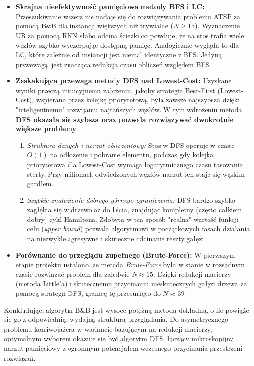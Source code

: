 \documentclass[12pt, a4paper]{article}
\begin{document}
\begin{itemize}
	\item \textbf{Skrajna nieefektywność pamięciowa metody BFS i LC:} Przeszukiwanie wszerz nie nadaje się do rozwiązywania problemu ATSP za pomocą B\&B dla instancji większych niż trywialne ($N \ge 15$). Wyznaczenie UB za pomocą RNN słabo odcina ścieżki co powduje, że na stos trafia wiele węzłów szybko wyczerpując dostępną pamięc. Analogicznie wygląda to dla LC, które zależnie od instancji jest niemal identyczne z BFS. Jedyną przwewagą jest znacząca redukcja czasu obliczeń względem BFS.
	
	\item \textbf{Zaskakująca przewaga metody DFS nad Lowest-Cost:} Uzyskane wyniki przeczą intuicyjnemu założeniu, jakoby strategia Best-First (Lowest-Cost), wspierana przez kolejkę priorytetową, była zawsze najszybsza dzięki "inteligentnemu" rozwijaniu najtańszych węzłów. W tym wdrożeniu metoda \textbf{DFS okazała się szybsza oraz pozwala rozwiązywać dwukrotnie większe problemy} 
	\begin{enumerate}
		\item \textit{Struktura danych i narzut obliczeniowy:} Stos w DFS operuje w czasie $O(1)$ na odłożenie i pobranie elementu, podczas gdy kolejka priorytetowa dla Lowest-Cost wymaga logarytmicznego czasu tasowania sterty. Przy milionach odwiedzonych węzłów narzut ten staje się wąskim gardłem.
		\item \textit{Szybkie znalezienie dobrego górnego ograniczenia:} DFS bardzo szybko zagłębia się w drzewo aż do liścia, znajdując kompletny (często całkiem dobry) cykl Hamiltona. Zdobyta w ten sposób "realna" wartość funkcji celu (\textit{upper bound}) pozwala algorytmowi w początkowych fazach działania na niezwykle agresywne i skuteczne odcinanie reszty gałęzi.
	\end{enumerate}
	
	\item \textbf{Porównanie do przeglądu zupełnego (Brute-Force):} W pierwszym etapie projektu ustalono, że metoda \textit{Brute-Force} była w stanie w rozsądnym czasie rozwiązać problem dla zaledwie $N \approx 15$. Dzięki redukcji macierzy (metoda Little'a) i skutecznemu przycinaniu nieskutecznych gałęzi drzewa za pomocą strategii DFS, granicę tę przesunięto do $N \approx 39$.
\end{itemize}

Konkludując, algorytm B\&B jest wysoce potężną metodą dokładną, o ile powiąże się go z odpowiednią, wydajną strukturą przeglądania. Do asymetrycznego problemu komiwojażera w wariancie bazującym na redukcji macierzy, optymalnym wyborem okazuje się być algorytm DFS, łączący mikroskopijny narzut pamięciowy z ogromnym potencjałem wczesnego przycinania przestrzeni rozwiązań.
	
\end{document}
